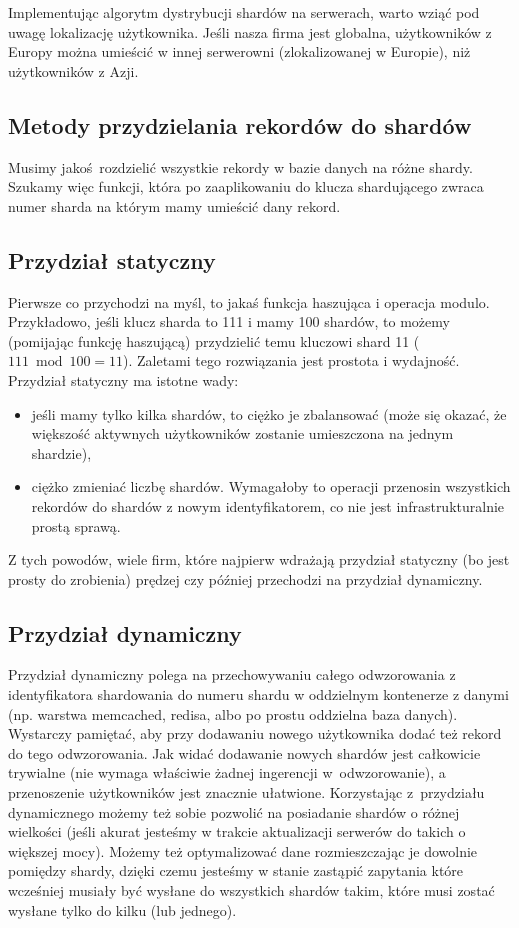 \documentclass[a4paper,12pt]{article}
\begin{document}
Implementując algorytm dystrybucji shardów na serwerach, warto wziąć pod uwagę lokalizację użytkownika. Jeśli nasza firma jest globalna, użytkowników z Europy można umieścić w innej serwerowni (zlokalizowanej w Europie), niż użytkowników z Azji.

\subsection{Metody przydzielania rekordów do shardów}

Musimy jakoś rozdzielić wszystkie rekordy w bazie danych na różne shardy. Szukamy więc funkcji, która po zaaplikowaniu do klucza shardującego zwraca numer sharda na którym mamy umieścić dany rekord.

\subsection{Przydział statyczny}

Pierwsze co przychodzi na myśl, to jakaś funkcja haszująca i operacja modulo. Przykładowo, jeśli klucz sharda to 111 i mamy 100 shardów, to możemy (pomijając funkcję haszującą) przydzielić temu kluczowi shard 11 ($111 \bmod 100 = 11$). Zaletami tego rozwiązania jest prostota i wydajność. Przydział statyczny ma istotne wady:

\begin{itemize}
 \setlength{\itemsep}{0.06cm}
 \setlength{\parskip}{0.06cm}
 \item jeśli mamy tylko kilka shardów, to ciężko je zbalansować (może się okazać, że większość aktywnych użytkowników zostanie umieszczona na jednym shardzie),
 \item ciężko zmieniać liczbę shardów. Wymagałoby to operacji przenosin wszystkich rekordów do shardów z nowym identyfikatorem, co nie jest infrastrukturalnie prostą sprawą.
\end{itemize}

Z tych powodów, wiele firm, które najpierw wdrażają przydział statyczny (bo jest prosty do zrobienia) prędzej czy później przechodzi na przydział dynamiczny.

\subsection{Przydział dynamiczny}

Przydział dynamiczny polega na przechowywaniu całego odwzorowania z identyfikatora shardowania do numeru shardu w oddzielnym kontenerze z danymi (np. warstwa memcached, redisa, albo po prostu oddzielna baza danych). Wystarczy pamiętać, aby przy dodawaniu nowego użytkownika dodać też rekord do tego odwzorowania. Jak widać dodawanie nowych shardów jest całkowicie trywialne (nie wymaga właściwie żadnej ingerencji w~odwzorowanie), a przenoszenie użytkowników jest znacznie ułatwione. Korzystając z~przydziału dynamicznego możemy też sobie pozwolić na posiadanie shardów o różnej wielkości (jeśli akurat jesteśmy w trakcie aktualizacji serwerów do takich o większej mocy). Możemy też optymalizować dane rozmieszczając je dowolnie pomiędzy shardy, dzięki czemu jesteśmy w stanie zastąpić zapytania które wcześniej musiały być wysłane do wszystkich shardów takim, które musi zostać wysłane tylko do kilku (lub jednego).
\end{document}
